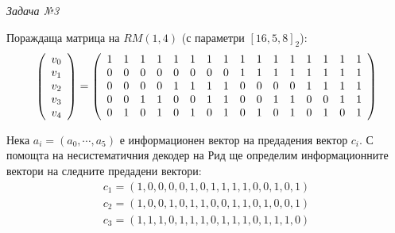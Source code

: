 \documentclass{report}
\begin{document}
\emph{Задача №3}





Пораждаща матрица на $RM\left( 1, 4 \right)$ (с параметри $[16, 5, 8]_2$):
\[ \left( \begin{array}{c}
v_0 \\
v_1 \\
v_2 \\ 
v_3 \\
v_4 \\
\end{array} \right) =
\left( \begin{array}{c c c c c c c c c c c c c c c c}
1 & 1 & 1 & 1 & 1 & 1 & 1 & 1 & 1 & 1 & 1 & 1 & 1 & 1 & 1 & 1 \\
0 & 0 & 0 & 0 & 0 & 0 & 0 & 0 & 1 & 1 & 1 & 1 & 1 & 1 & 1 & 1 \\
0 & 0 & 0 & 0 & 1 & 1 & 1 & 1 & 0 & 0 & 0 & 0 & 1 & 1 & 1 & 1 \\
0 & 0 & 1 & 1 & 0 & 0 & 1 & 1 & 0 & 0 & 1 & 1 & 0 & 0 & 1 & 1 \\
0 & 1 & 0 & 1 & 0 & 1 & 0 & 1 & 0 & 1 & 0 & 1 & 0 & 1 & 0 & 1 \\
\end{array} \right) \]

Нека $a_i = \left( a_{0},\cdots,a_{5} \right)$ е информационен вектор на предадения вектор $c_i$. С помощта на несистематичния декодер на Рид ще определим информационните вектори на следните предадени вектори:
\[
\begin{array}{c}
c_1 = \left( 1, 0, 0, 0, 0, 1, 0, 1, 1, 1, 1, 0, 0, 1, 0, 1 \right) \\
c_2 = \left( 1, 0, 0, 1, 0, 1, 1, 0, 0, 1, 1, 0, 1, 0, 0, 1 \right) \\
c_3 = \left( 1, 1, 1, 0, 1, 1, 1, 0, 1, 1, 1, 0, 1, 1, 1, 0 \right) \\
\end{array}
\]
\end{document}
